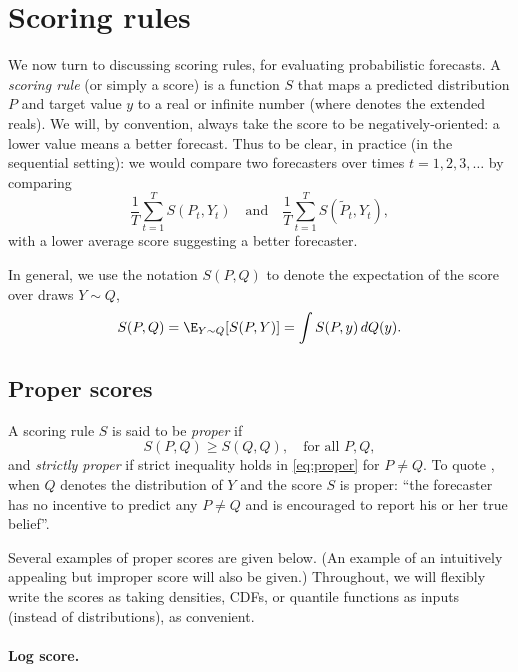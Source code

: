 \documentclass{article}
\begin{document}
\section{Scoring rules}

We now turn to discussing scoring rules, for evaluating probabilistic
forecasts. A \emph{scoring rule} (or simply a score) is a function $S$ that maps
a predicted distribution $P$ and target value $y$ to a real or infinite number 
 (where \smash{$\widebar\R = \R \cup \{\pm 
  \infty\}$} denotes the extended reals). We will, by convention, always take
the score to be negatively-oriented: a lower value means a better forecast.    
Thus to be clear, in practice (in the sequential setting): we would compare two 
forecasters  over times $t=1,2,3,\dots$ by comparing    
\[
\frac{1}{T} \sum_{t=1}^T S(P_t, Y_t) \quad \text{and} \quad
\frac{1}{T} \sum_{t=1}^T S(\tilde{P}_t, Y_t),
\]
with a lower average score suggesting a better forecaster.

In general, we use the notation $S(P, Q)$ to denote the expectation of the score
over draws $Y \sim Q$,  
\[
S(P, Q) = \E_{Y \sim Q} [S(P, Y)] = \int S(P, y) \, dQ(y).
\]

\subsection{Proper scores}

A scoring rule $S$ is said to be \emph{proper} if
\begin{equation}
\label{eq:proper}
S(P, Q) \geq S(Q, Q), \quad \text{for all $P,Q$},
\end{equation}
and \emph{strictly proper} if strict inequality holds in \eqref{eq:proper} for
$P \not= Q$. To quote \citet{gneiting2007strictly}, when $Q$ denotes the 
distribution of $Y$ and the score $S$ is proper: ``the forecaster has no
incentive to predict any $P \not= Q$ and is encouraged to report his or her true
belief''.  

Several examples of proper scores are given below. (An example of an intuitively
appealing but improper score will also be given.) Throughout, we will flexibly
write the scores as taking densities, CDFs, or quantile functions as inputs
(instead of distributions), as convenient.        

\paragraph{Log score.}
\end{document}
